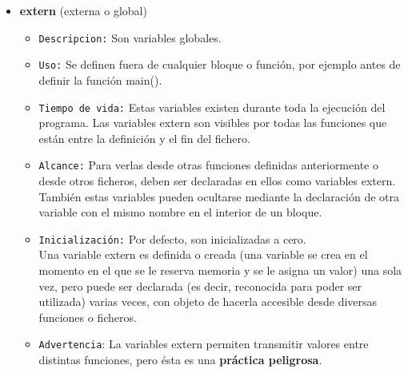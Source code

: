 \documentclass[letterpaper]{report}
\begin{document}
\begin{itemize}
\item \textbf{extern} (externa o global)
  \begin{itemize}
    \item \texttt{Descripcion:}  Son variables globales.
    \item \texttt{Uso:} Se definen fuera de cualquier bloque o función, por ejemplo antes de definir la función main(). 
    \item \texttt{Tiempo de vida:} Estas variables existen durante toda la ejecución del programa. Las variables extern son visibles por todas las funciones que están entre la definición y el fin del fichero.
    \item \texttt{Alcance:} Para verlas desde otras funciones definidas anteriormente o desde otros ficheros, deben ser declaradas en ellos como variables extern. También estas variables pueden ocultarse mediante la declaración de otra variable con el mismo nombre en el interior de un bloque.
    \item \texttt{Inicialización:} Por defecto, son inicializadas a cero.\\
     Una variable extern es definida o creada (una variable se crea en el momento en el que se le reserva memoria y se le asigna un valor) una sola vez, pero puede ser declarada (es decir, reconocida para poder ser utilizada) varias veces, con objeto de hacerla accesible desde diversas funciones o ficheros. 
    \item \texttt{Advertencia}: La variables extern permiten transmitir valores entre distintas funciones, pero ésta es una \textbf{práctica peligrosa}.
  \end{itemize}


\end{itemize}
\end{document}
